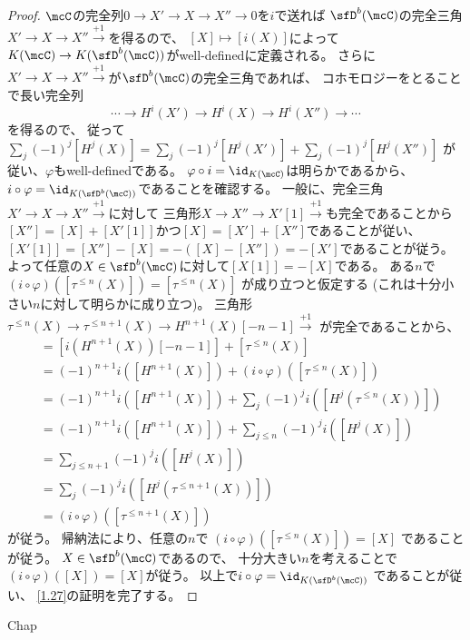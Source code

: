 \documentclass[uplatex,dvipdfmx]{jsarticle}
\begin{document}
\begin{proof}
  \(\mcC\)の完全列\(0\to X'\to X\to X''\to 0\)を\(i\)で送れば
  \(\sfD^b(\mcC)\)の完全三角
  \(X'\to X\to X''\xrightarrow{+1}\)を得るので、
  \([X]\mapsto [i(X)]\)によって
  \(K(\mcC)\to K(\sfD^b(\mcC))\)がwell-definedに定義される。
  さらに\(X'\to X\to X''\xrightarrow{+1}\)が\(\sfD^b(\mcC)\)の完全三角であれば、
  コホモロジーをとることで長い完全列
  \[\cdots \to H^i(X')\to H^i(X) \to H^i(X'') \to \cdots\]
  を得るので、
  従って\(\sum_j(-1)^j[H^j(X)] = \sum_j(-1)^j[H^j(X')] + \sum_j(-1)^j[H^j(X'')]\)
  が従い、\(\varphi\)もwell-definedである。
  \(\varphi\circ i = \id_{K(\mcC)}\)は明らかであるから、
  \(i\circ \varphi = \id_{K(\sfD^b(\mcC))}\)であることを確認する。
  一般に、完全三角\(X'\to X\to X'' \xrightarrow{+1}\)に対して
  三角形\(X\to X''\to X'[1] \xrightarrow{+1}\)も完全であることから
  \([X''] = [X]+[X'[1]]\)かつ\([X] = [X']+[X'']\)であることが従い、
  \([X'[1]] = [X'']-[X] = -([X]-[X'']) = -[X']\)であることが従う。
  よって任意の\(X\in \sfD^b(\mcC)\)に対して\([X[1]] = -[X]\)である。
  ある\(n\)で
  \((i\circ \varphi)([\tau^{\leq n}(X)]) = [\tau^{\leq n}(X)]\)
  が成り立つと仮定する
  (これは十分小さい\(n\)に対して明らかに成り立つ)。
  三角形
  \(\tau^{\leq n}(X) \to \tau^{\leq n+1}(X) \to H^{n+1}(X)[-n-1]\xrightarrow{+1}\)
  が完全であることから、
  \begin{align*}
    [\tau^{\leq n+1}(X)] &= [i(H^{n+1}(X))[-n-1]] + [\tau^{\leq n}(X)] \\
    &= (-1)^{n+1}i([H^{n+1}(X)]) + (i\circ \varphi)([\tau^{\leq n}(X)]) \\
    &= (-1)^{n+1}i([H^{n+1}(X)]) + \sum_j(-1)^ji([H^j(\tau^{\leq n}(X))]) \\
    &= (-1)^{n+1}i([H^{n+1}(X)]) + \sum_{j\leq n}(-1)^ji([H^j(X)]) \\
    &= \sum_{j\leq n+1}(-1)^ji([H^j(X)]) \\
    &= \sum_j(-1)^ji([H^j(\tau^{\leq n+1}(X))]) \\
    &= (i\circ \varphi)([\tau^{\leq n+1}(X)])
  \end{align*}
  が従う。
  帰納法により、任意の\(n\)で
  \((i\circ \varphi)([\tau^{\leq n}(X)]) = [X]\)
  であることが従う。
  \(X\in \sfD^b(\mcC)\)であるので、
  十分大きい\(n\)を考えることで
  \((i\circ\varphi)([X]) = [X]\)が従う。
  以上で\(i\circ \varphi = \id_{K(\sfD^b(\mcC))}\)
  であることが従い、
  \autoref{1.27}の証明を完了する。
\end{proof}





\ifcsname Chap\endcsname\else
\printbibliography
\end{document}
